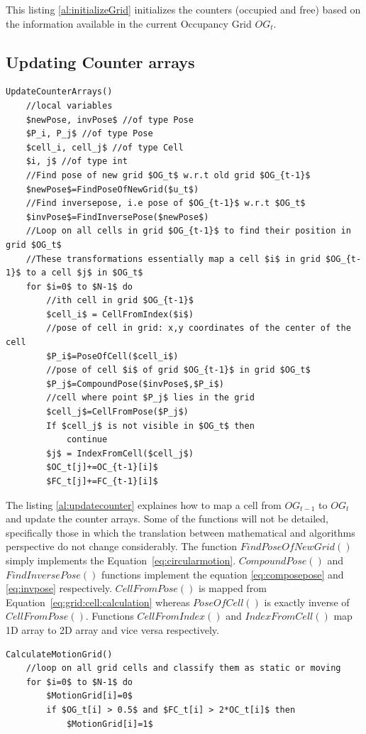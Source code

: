This listing \ref{al:initializeGrid} initializes the counters (occupied and free) based on the information available in the current Occupancy Grid $OG_t$.

\subsection{Updating Counter arrays}

\begin{lstlisting}[label=al:updatecounter,mathescape=true,caption={Update counter arrays}]
UpdateCounterArrays()
	//local variables
	$newPose, invPose$ //of type Pose
	$P_i, P_j$ //of type Pose
	$cell_i, cell_j$ //of type Cell
	$i, j$ //of type int
	//Find pose of new grid $OG_t$ w.r.t old grid $OG_{t-1}$
	$newPose$=FindPoseOfNewGrid($u_t$)
	//Find inversepose, i.e pose of $OG_{t-1}$ w.r.t $OG_t$
	$invPose$=FindInversePose($newPose$)
	//Loop on all cells in grid $OG_{t-1}$ to find their position in grid $OG_t$
	//These transformations essentially map a cell $i$ in grid $OG_{t-1}$ to a cell $j$ in $OG_t$
	for $i=0$ to $N-1$ do
		//ith cell in grid $OG_{t-1}$
		$cell_i$ = CellFromIndex($i$)
		//pose of cell in grid: x,y coordinates of the center of the cell
		$P_i$=PoseOfCell($cell_i$)
		//pose of cell $i$ of grid $OG_{t-1}$ in grid $OG_t$
		$P_j$=CompoundPose($invPose$,$P_i$)
		//cell where point $P_j$ lies in the grid
		$cell_j$=CellFromPose($P_j$)
		If $cell_j$ is not visible in $OG_t$ then
			continue
		$j$ = IndexFromCell($cell_j$)
		$OC_t[j]+=OC_{t-1}[i]$
		$FC_t[j]+=FC_{t-1}[i]$
\end{lstlisting}
The listing \ref{al:updatecounter} explaines how to map a cell from $OG_{t-1}$ to $OG_t$ and update the counter arrays. Some of the functions will not be detailed, specifically those in which the translation between mathematical and algorithms perspective do not change considerably.
The function $FindPoseOfNewGrid()$ simply implements the Equation~\ref{eq:circularmotion}. $CompoundPose()$ and \\$FindInversePose()$ functions implement the equation \ref{eq:composepose} and \ref{eq:invpose}  respectively. $CellFromPose()$ is mapped from Equation~\ref{eq:grid:cell:calculation} whereas $PoseOfCell()$ is exactly inverse of $CellFromPose()$. Functions $CellFromIndex()$ and $IndexFromCell()$ map 1D array to 2D array and vice versa respectively.

\begin{lstlisting}[label=al:motiongrid,mathescape=true,caption={Calculate motion grid}]
CalculateMotionGrid()
	//loop on all grid cells and classify them as static or moving
	for $i=0$ to $N-1$ do
		$MotionGrid[i]=0$
		if $OG_t[i] > 0.5$ and $FC_t[i] > 2*OC_t[i]$ then
			$MotionGrid[i]=1$
\end{lstlisting}

